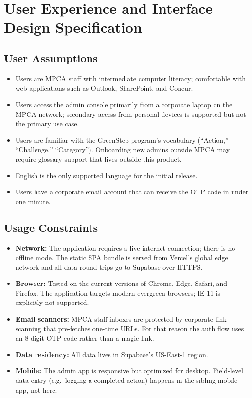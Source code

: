 \documentclass[11pt,letterpaper]{article}
\begin{document}
\newpage

\section{User Experience and Interface Design Specification}

\subsection{User Assumptions}

\begin{itemize}[noitemsep]
  \item Users are MPCA staff with intermediate computer literacy;
        comfortable with web applications such as Outlook, SharePoint,
        and Concur.
  \item Users access the admin console primarily from a corporate
        laptop on the MPCA network; secondary access from personal
        devices is supported but not the primary use case.
  \item Users are familiar with the GreenStep program's vocabulary
        (``Action,'' ``Challenge,'' ``Category''). Onboarding new
        admins outside MPCA may require glossary support that lives
        outside this product.
  \item English is the only supported language for the initial release.
  \item Users have a corporate email account that can receive the
        OTP code in under one minute.
\end{itemize}

\subsection{Usage Constraints}

\begin{itemize}[noitemsep]
  \item \textbf{Network:} The application requires a live internet
        connection; there is no offline mode. The static SPA bundle
        is served from Vercel's global edge network and all data
        round-trips go to Supabase over HTTPS.
  \item \textbf{Browser:} Tested on the current versions of Chrome,
        Edge, Safari, and Firefox. The application targets modern
        evergreen browsers; IE 11 is explicitly not supported.
  \item \textbf{Email scanners:} MPCA staff inboxes are protected by
        corporate link-scanning that pre-fetches one-time URLs. For
        that reason the auth flow uses an 8-digit OTP code rather
        than a magic link.
  \item \textbf{Data residency:} All data lives in Supabase's
        US-East-1 region.
  \item \textbf{Mobile:} The admin app is responsive but optimized
        for desktop. Field-level data entry (e.g.\ logging a
        completed action) happens in the sibling mobile app, not
        here.
\end{itemize}
\end{document}

